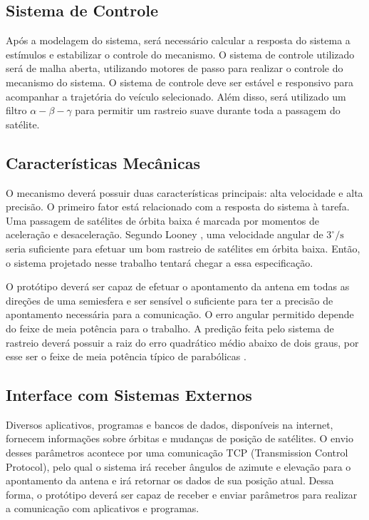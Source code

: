 \subsection{Sistema de Controle}
Após a modelagem do sistema, será necessário calcular a resposta do sistema a estímulos e estabilizar o controle do mecanismo.
O sistema de controle utilizado será de malha aberta, utilizando motores de passo para realizar o controle do mecanismo do sistema.
O sistema de controle deve ser estável e responsivo para acompanhar a trajetória do veículo selecionado.
Além disso, será utilizado um filtro $\alpha-\beta-\gamma$ para permitir um rastreio suave durante toda a passagem do satélite.

\subsection{Características Mecânicas}
O mecanismo deverá possuir duas características principais: alta velocidade e alta precisão.
O primeiro fator está relacionado com a resposta do sistema à tarefa.
Uma passagem de satélites de órbita baixa é marcada por momentos de aceleração e desaceleração.
Segundo Looney \cite{looney1965coverage}, uma velocidade angular de $3^{\circ}\text{/s}$ seria suficiente para efetuar um bom rastreio de satélites em órbita baixa.
Então, o sistema projetado nesse trabalho tentará chegar a essa especificação.

O protótipo deverá ser capaz de efetuar o apontamento da antena em todas as direções de uma semiesfera e ser sensível o suficiente para ter a precisão de apontamento necessária para a comunicação.
O erro angular permitido depende do feixe de meia potência para o trabalho.
A predição feita pelo sistema de rastreio deverá possuir a raiz do erro quadrático médio abaixo de dois graus, por esse ser o feixe de meia potência típico de parabólicas \cite{balanis2016}.

\subsection{Interface com Sistemas Externos}
Diversos aplicativos, programas e bancos de dados, disponíveis na internet, fornecem informações sobre órbitas e mudanças de posição
de satélites. O envio desses parâmetros acontece por uma comunicação TCP (Transmission Control Protocol), pelo qual o
sistema irá receber ângulos de azimute e elevação para o apontamento da antena e irá retornar os dados de sua posição atual. Dessa forma, o protótipo deverá ser capaz de
receber e enviar parâmetros para realizar a comunicação com aplicativos e programas.

